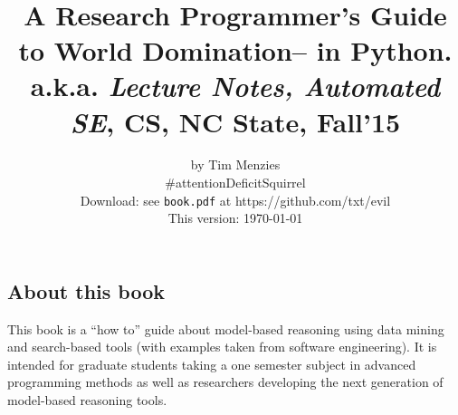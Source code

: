 \documentclass[9pt,twocolumn]{article}
\date{}
\begin{document}
 


\onecolumn
\title{
  {\bf {}}\\~\\~\\
    \\
    \Large{A Research Programmer's Guide to World Domination-- in Python.}\\
    \Large{a.k.a. {\em Lecture Notes, Automated
  SE}, CS, NC State, Fall'15}}
\author{by Tim Menzies \\\#attentionDeficitSquirrel\\Download:
  see {\tt book.pdf} at https://github.com/txt/evil\\This version: \today}
   

\maketitle
\thispagestyle{empty}

\clearpage
\small
\twocolumn

\pagestyle{fancy}



 \subsection*{About this book} This book is a  ``how to'' guide about model-based reasoning using
   data mining and search-based tools (with examples taken from software engineering).
   It is intended for graduate  students taking
  a one semester subject in advanced programming methods as
  well as researchers developing the next generation
  of model-based reasoning tools.  
\end{document}
